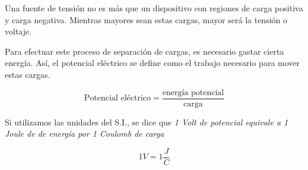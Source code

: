 Una fuente de tensión no es más que un dispositivo con regiones de carga positiva y carga negativa. Mientras mayores sean estas cargas, mayor será la tensión o voltaje.

Para efectuar este proceso de separación de cargas, es necesario gastar cierta energía. Así, el potencial eléctrico se define como el trabajo necesario para mover estas cargas.

$$ \text{Potencial eléctrico} = \frac{\text{energía potencial}}{\text{carga}} $$

Si utilizamos las unidades del S.I., se dice que \textit{1 Volt de potencial equivale a 1 Joule de de energía por 1 Coulomb de carga}

$$ 1 V = 1 \frac{J}{C} $$